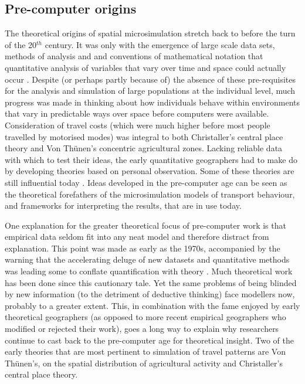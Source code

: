 \subsection{Pre-computer origins}
The theoretical origins of spatial microsimulation stretch back to before the
turn of the 20$^{th}$ century. It was only with the emergence of large scale
data sets, methods of analysis and and conventions of mathematical notation that
quantitative analysis of variables that vary over time and space could actually
occur \citep{Ballas2009-sage}.
Despite (or perhaps partly because of) the absence of these pre-requisites for
the analysis and simulation of large populations at the individual level, much
progress was made in thinking about how individuals behave within environments
that vary in predictable ways over space before computers were available.
Consideration of travel costs (which were much higher before most
people travelled by motorised modes) was integral to both Christaller's
central place theory and Von Th\"{u}nen's concentric agricultural zones.
Lacking reliable data with which to test their ideas, the
early quantitative geographers had to make do by
developing theories based on personal observation.
Some of these theories are still influential today \citep{Clarke1985}.
Ideas developed in the pre-computer age can be seen as the theoretical
forefathers of the microsimulation models of transport behaviour, and frameworks
for interpreting the results, that are in use today.

One explanation for the greater theoretical focus of pre-computer work
is that empirical data seldom fit into any neat model and therefore
distract from explanation.
This point was made as early as the 1970s, accompanied by the
warning that the
accelerating deluge of new datasets and quantitative methods was leading some
to conflate quantification with theory \citep{Wilson1972-theoretical}.
Much theoretical work has been done since this cautionary tale. Yet the
same problems of being blinded by new information (to the detriment of
deductive thinking) face modellers now, probably to a greater extent.
This, in combination with the fame enjoyed by early theoretical geographers
(as opposed to more recent empirical geographers who modified or
rejected their work), goes a long way to explain why researchers continue to cast back to
the pre-computer age for theoretical
insight. Two of the early theories that are most pertinent to
simulation of travel patterns are Von Th\"{u}nen's, on the
spatial distribution of
agricultural activity and Christaller's central place theory.

